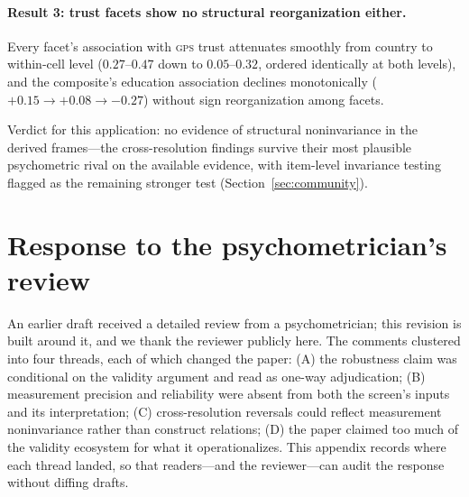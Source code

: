 \documentclass[10pt,letterpaper]{article}
\newcommand{\GPS}{\textsc{gps}}
\begin{document}
\paragraph{Result 3: trust facets show no structural reorganization either.}
Every facet's association with \GPS{} trust attenuates smoothly from country to within-cell level ($0.27$–$0.47$ down to $0.05$–$0.32$, ordered identically at both levels), and the composite's education association declines monotonically ($+0.15 \to +0.08 \to -0.27$) without sign reorganization among facets.

\medskip
\noindent
Verdict for this application: no evidence of structural noninvariance in the derived frames---the cross-resolution findings survive their most plausible psychometric rival on the available evidence, with item-level invariance testing flagged as the remaining stronger test (Section~\ref{sec:community}).

\section{Response to the psychometrician's review}
\label{app:response}

An earlier draft received a detailed review from a psychometrician; this revision is built around it, and we thank the reviewer publicly here.
The comments clustered into four threads, each of which changed the paper: (A) the robustness claim was conditional on the validity argument and read as one-way adjudication; (B) measurement precision and reliability were absent from both the screen's inputs and its interpretation; (C) cross-resolution reversals could reflect measurement noninvariance rather than construct relations; (D) the paper claimed too much of the validity ecosystem for what it operationalizes.
This appendix records where each thread landed, so that readers---and the reviewer---can audit the response without diffing drafts.
\end{document}

